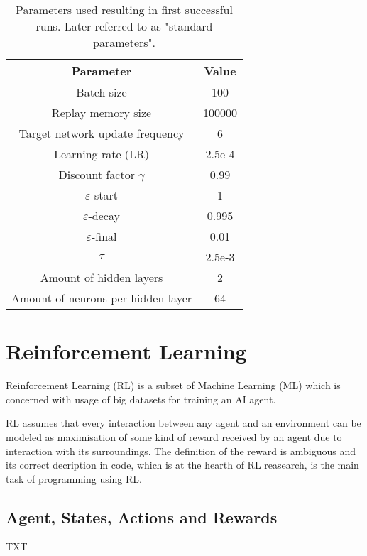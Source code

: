 \documentclass{article}
\begin{document}
\begin{table}[h]
\caption{Parameters used resulting in first successful runs. Later referred to as "standard parameters".}
\label{tab:table1}
\begin{center}
    \begin{tabular}{cc}
        \hline
        \textbf{Parameter}                  & \textbf{Value} \\
        \hline
        Batch size                          & 100     \\
        Replay memory size                  & 100000  \\
        Target network update frequency     & 6       \\
        Learning rate (LR)                  & 2.5e-4  \\
        Discount factor $\gamma$            & 0.99    \\
        $\varepsilon$-start                 & 1       \\
        $\varepsilon$-decay                 & 0.995   \\
        $\varepsilon$-final                 & 0.01    \\
        $\tau$                              & 2.5e-3  \\
        Amount of hidden layers             & 2       \\
        Amount of neurons per hidden layer  & 64      \\
        \hline
    \end{tabular}
\end{center}
\end{table}

\pagebreak

\section{Reinforcement Learning}
Reinforcement Learning (RL) is a subset of Machine Learning (ML) which is concerned with usage of big datasets for training an AI agent.

RL assumes that every interaction between any agent and an environment can be modeled as maximisation of some kind of reward received by an agent due to interaction with its surroundings. The definition of the reward is ambiguous and its correct decription in code, which is at the hearth of RL reasearch, is the main task of programming using RL.
\subsection{Agent, States, Actions and Rewards}
TXT
\end{document}
